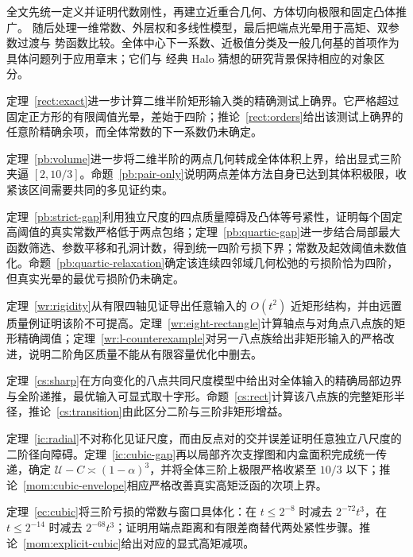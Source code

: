 全文先统一定义并证明代数刚性，再建立近重合几何、方体切向极限和固定凸体推广。
随后处理一维常数、外层权和多线性模型，最后把端点光晕用于高矩、双参数过渡与
势函数比较。全体中心下一系数、近极值分类及一般几何基的首项作为具体问题列于应用章末；它们与
经典 Halo 猜想的研究背景\cite{Hagelstein2025}保持相应的对象区分。

定理~\ref{rect:exact}进一步计算二维半阶矩形输入类的精确测试上确界。它严格超过固定正方形的有限阈值光晕，差始于四阶；推论~\ref{rect:orders}给出该测试上确界的任意阶精确余项，而全体常数的下一系数仍未确定。

定理~\ref{pb:volume}进一步将二维半阶的两点几何转成全体体积上界，给出显式三阶夹逼 $[2,10/3]$。命题~\ref{pb:pair-only}说明两点差体方法自身已达到其体积极限，收紧该区间需要共同的多见证约束。

定理~\ref{pb:strict-gap}利用独立尺度的四点质量障碍及凸体等号紧性，证明每个固定高阈值的真实常数严格低于两点包络；定理~\ref{pb:quartic-gap}进一步结合局部最大函数筛选、参数平移和孔洞计数，得到统一四阶亏损下界；常数及起效阈值未数值化。命题~\ref{pb:quartic-relaxation}确定该连续四邻域几何松弛的亏损阶恰为四阶，但真实光晕的最优亏损阶仍未确定。

定理~\ref{wr:rigidity}从有限四轴见证导出任意输入的 $O(t^2)$ 近矩形结构，并由远置质量例证明该阶不可提高。定理~\ref{wr:eight-rectangle}计算轴点与对角点八点族的矩形精确阈值；定理~\ref{wr:l-counterexample}对另一八点族给出非矩形输入的严格改进，说明二阶角区质量不能从有限容量优化中删去。

定理~\ref{cs:sharp}在方向变化的八点共同尺度模型中给出对全体输入的精确局部边界与全阶递推，最优输入可显式取十字形。命题~\ref{cs:rect}计算该八点族的完整矩形半径，推论~\ref{cs:transition}由此区分二阶与三阶非矩形增益。

定理~\ref{ic:radial}不对称化见证尺度，而由反点对的交并误差证明任意独立八尺度的二阶径向障碍。定理~\ref{ic:cubic-gap}再以局部齐次支撑图和内盒面积完成统一传递，确定 $\mathcal U-C\asymp(1-\alpha)^3$，并将全体三阶上极限严格收紧至 $10/3$ 以下；推论~\ref{mom:cubic-envelope}相应严格改善真实高矩泛函的次项上界。

定理~\ref{ec:cubic}将三阶亏损的常数与窗口具体化：在 $t\le2^{-8}$ 时减去 $2^{-72}t^3$，在 $t\le2^{-14}$ 时减去 $2^{-68}t^3$；证明用端点距离和有限差商替代两处紧性步骤。推论~\ref{mom:explicit-cubic}给出对应的显式高矩减项。
